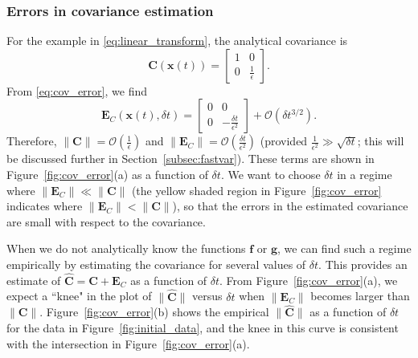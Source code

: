 \subsubsection{Errors in covariance estimation}

For the example in \eqref{eq:linear_transform}, the analytical covariance is
 \begin{equation} \label{eq:cov_linear_example}
\mathbf{C}(\mathbf{x}(t)) =
\begin{bmatrix}
1 & 0 \\
0 & \frac{1}{\epsilon}
\end{bmatrix}.
\end{equation}
%
From \eqref{eq:cov_error}, we find
%
\begin{equation}
\mathbf{E}_C(\mathbf{x}(t), \delta t) =
\begin{bmatrix}
0 & 0 \\
0 & -\frac{\delta t}{\epsilon^2}
\end{bmatrix}
+ \mathcal{O} (\delta t^{3/2}) .
\end{equation}
%
Therefore, $\| \mathbf{C} \| = \mathcal{O} \left( \frac{1}{\epsilon} \right)$ and $\|\mathbf{E}_C \| = \mathcal{O}\left(\frac{\delta t}{\epsilon^2} \right)$ (provided $\frac{1}{\epsilon^2} \gg \sqrt{\delta t}$; this will be discussed further in Section~\ref{subsec:fastvar}).
%
These terms are shown in Figure~\ref{fig:cov_error}(a) as a function of $\delta t$.
%
We want to choose $\delta t$ in a regime where $\| \mathbf{E}_C \| \ll \| \mathbf{C} \|$ (the yellow shaded region in Figure~\ref{fig:cov_error} indicates where $\| \mathbf{E}_C \| < \| \mathbf{C} \|$), so that the errors in the estimated covariance are small with respect to the covariance.

When we do not analytically know the functions $\mathbf{f}$ or $\mathbf{g}$, we can find such a regime empirically by
estimating the covariance for several values of $\delta t$.
%
This provides an estimate of $\hat{\mathbf{C}} = \mathbf{C} + \mathbf{E}_C$ as a function of $\delta t$.
%
From Figure~\ref{fig:cov_error}(a), we expect a ``knee" in the plot of $\| \hat{\mathbf{C}} \|$ versus $\delta t$ when $\| \mathbf{E}_C \|$ becomes larger than $\| \mathbf{C}\|$.
%
Figure~\ref{fig:cov_error}(b) shows the empirical $\| \hat{\mathbf{C}} \|$ as a function of $\delta t$ for the data in Figure~\ref{fig:initial_data}, and the knee in this curve is consistent with the intersection in Figure~\ref{fig:cov_error}(a).

